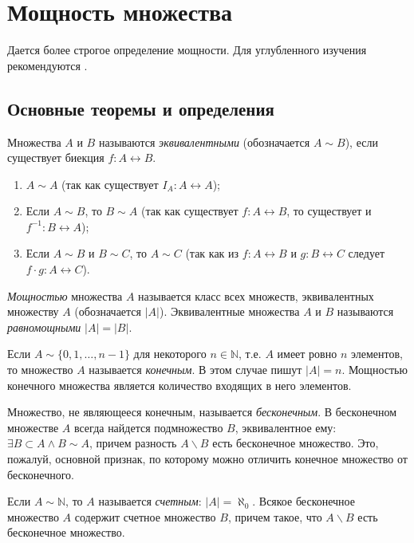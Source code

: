 \chapter{Мощность множества}

Дается более строгое определение мощности. Для углубленного изучения рекомендуются \cite{bib:sudoplatov:discrmath,bib:shaporev:discretemath}.


\section{Основные теоремы и определения}

Множества $A$ и $B$ называются \emph{эквивалентными} (обозначается $A\sim B$), если существует биекция $f:A\leftrightarrow B$.

\begin{enumerate}
	\item $A\sim A$ (так как существует $I_A:A\leftrightarrow A$);
	\item Если $A\sim B$, то $B\sim A$ (так как существует $f:A\leftrightarrow B$, то существует и $f^{-1}:B\leftrightarrow A$);
	\item Если $A\sim B$ и $B\sim C$, то $A\sim C$ (так как из $f:A\leftrightarrow B$ и $g:B\leftrightarrow C$ следует $f\cdot g:A\leftrightarrow C$).	
\end{enumerate}

\emph{Мощностью} множества $A$ называется класс всех множеств, эквивалентных множеству $A$ (обозначается $|A|$). Эквивалентные множества $A$ и $B$ называются \emph{равномощными} $|A|=|B|$.

Если $A\sim \{0,1,\ldots,n-1\}$ для некоторого $n\in\mathbb{N}$, т.е. $A$ имеет ровно $n$ элементов, то множество $A$ называется \emph{конечным}. В этом случае пишут $|A|=n$. Мощностью конечного множества является количество входящих в него элементов.

Множество, не являющееся конечным, называется \emph{бесконечным}. В бесконечном 
множестве $A$ всегда найдется подмножество $B$, эквивалентное ему: $\exists B\subset A\land B\sim A$, причем разность $A\backslash B$ есть бесконечное множество. Это, пожалуй, основной признак, по которому можно отличить конечное множество от бесконечного.

Если $A\sim \mathbb{N}$, то $A$ называется \emph{счетным}: $|A|=\aleph_0$. Всякое бесконечное множество $A$ содержит счетное множество $B$, причем такое, что $A\backslash B$ есть бесконечное множество.

